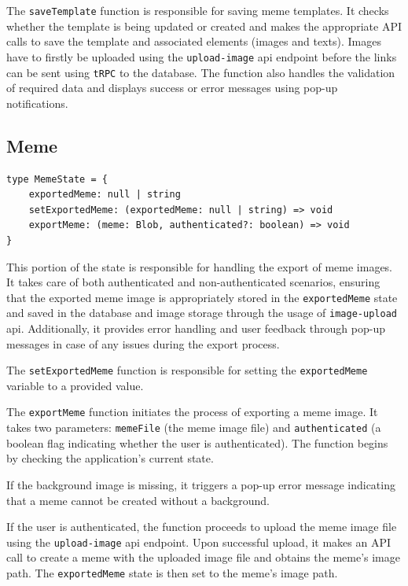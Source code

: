 The \texttt{saveTemplate} function is responsible for saving meme templates. It checks whether the template is being updated or created and makes the appropriate API calls to save the template and associated elements (images and texts). Images have to firstly be uploaded using the \texttt{upload-image} \acrshort{api} endpoint before the links can be sent using \texttt{tRPC} to the database. The function also handles the validation of required data and displays success or error messages using pop-up notifications.

\subsection{Meme}

\begin{verbatim}
type MemeState = {
    exportedMeme: null | string
    setExportedMeme: (exportedMeme: null | string) => void
    exportMeme: (meme: Blob, authenticated?: boolean) => void
}
\end{verbatim}

This portion of the state is responsible for handling the export of meme images. It takes care of both authenticated and non-authenticated scenarios, ensuring that the exported meme image is appropriately stored in the \texttt{exportedMeme} state and saved in the database and image storage through the usage of \texttt{image-upload} \acrshort{api}. Additionally, it provides error handling and user feedback through pop-up messages in case of any issues during the export process.

The \texttt{setExportedMeme} function is responsible for setting the \texttt{exportedMeme} variable to a provided value.

The \texttt{exportMeme} function initiates the process of exporting a meme image. It takes two parameters: \texttt{memeFile} (the meme image file) and \texttt{authenticated} (a boolean flag indicating whether the user is authenticated). The function begins by checking the application's current state.

If the background image is missing, it triggers a pop-up error message indicating that a meme cannot be created without a background.

If the user is authenticated, the function proceeds to upload the meme image file using the \texttt{upload-image} \acrshort{api} endpoint. Upon successful upload, it makes an API call to create a meme with the uploaded image file and obtains the meme's image path. The \texttt{exportedMeme} state is then set to the meme's image path.


